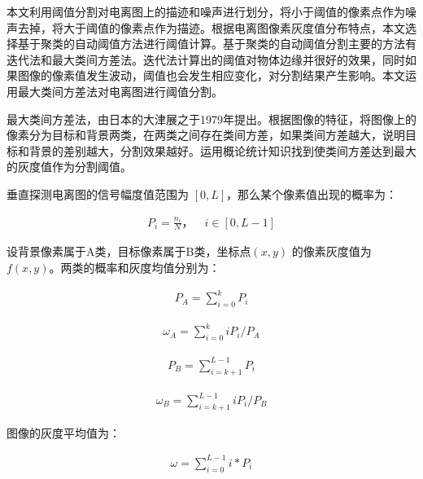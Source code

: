 本文利用阈值分割对电离图上的描迹和噪声进行划分，将小于阈值的像素点作为噪声去掉，将大于阈值的像素点作为描迹。根据电离图像素灰度值分布特点，本文选择基于聚类的自动阈值方法进行阈值计算。基于聚类的自动阈值分割主要的方法有迭代法和最大类间方差法。迭代法计算出的阈值对物体边缘并很好的效果，同时如果图像的像素值发生波动，阈值也会发生相应变化，对分割结果产生影响。本文运用最大类间方差法对电离图进行阈值分割。
         
最大类间方差法\cite{otsu1975threshold}，由日本的大津展之于1979年提出。根据图像的特征，将图像上的像素分为目标和背景两类，在两类之间存在类间方差，如果类间方差越大，说明目标和背景的差别越大，分割效果越好。运用概论统计知识找到使类间方差达到最大的灰度值作为分割阈值。
         
垂直探测电离图的信号幅度值范围为 $[0, L]$，那么某个像素值出现的概率为：
\begin{linenomath}
\begin{align}
P_{i}=\frac{n_{i}}{N}，\quad i\in[0,L-1]
\label{式3_1}
\end{align}
\end{linenomath}
         
设背景像素属于A类，目标像素属于B类，坐标点$(x,y)$ 的像素灰度值为 $f(x,y)$。两类的概率和灰度均值分别为：
\begin{linenomath}
\begin{align}
P_{A}=\sum_{i=0}^{k}P_{i}  
\label{式3_2}
\end{align}
\end{linenomath}
\begin{linenomath}
\begin{align}
 \omega_{A}=\sum_{i=0}^{k}iP_{i}/P_{A}   
\label{式3_3}
\end{align}
\end{linenomath}  
\begin{linenomath}
\begin{align}
  P_{B}=\sum_{i=k+1}^{L-1}P_{i} 
\label{式3_4}
\end{align}
\end{linenomath}
\begin{linenomath}
\begin{align}
 \omega_{B}=\sum_{i=k+1}^{L-1}iP_{i}/P_{B} 
\label{式3_5}
\end{align}
\end{linenomath}

图像的灰度平均值为：
\begin{linenomath}
\begin{align}
\omega=\sum_{i=0}^{L-1}i*P_{i}
\label{式3_6}
\end{align}
\end{linenomath}

